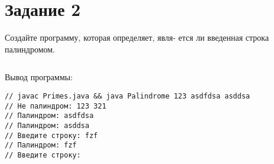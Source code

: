 \chapter*{Задание 2}
\label{ch:Task2}
Создайте программу, которая определяет, явля-
ется ли введенная строка палиндромом.

\inputminted{java}{../src/part2/Palindrome.java}

Вывод программы:
\begin{verbatim}
// javac Primes.java && java Palindrome 123 asdfdsa asddsa
// Не палиндром: 123 321
// Палиндром: asdfdsa
// Палиндром: asddsa
// Введите строку: fzf
// Палиндром: fzf
// Введите строку:
\end{verbatim}



\endinput

